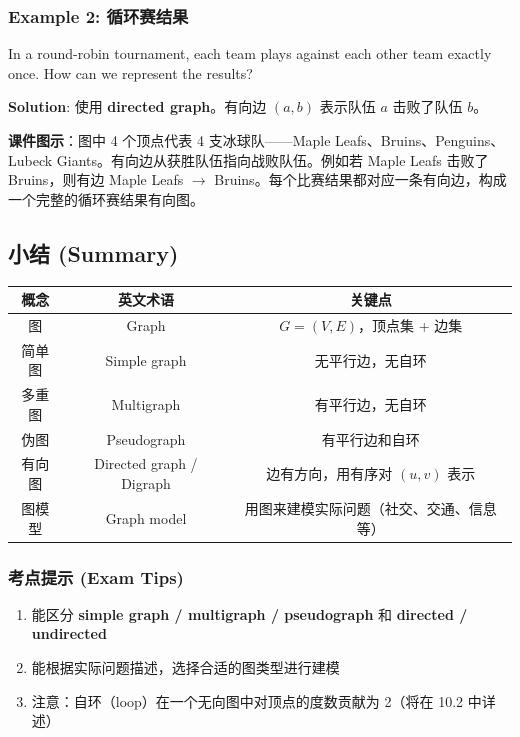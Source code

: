 \documentclass[10pt,a4paper,openany]{ctexbook}
\theoremstyle{definition}
\theoremstyle{remark}
\renewenvironment{quote}
  {\list{}{\leftmargin=1em\rightmargin=0pt\topsep=0.5pt\partopsep=0pt}\item[]}
  {\endlist}
\begin{document}
\subsubsection{Example 2: 循环赛结果}

\begin{quote}
In a round-robin tournament, each team plays against each other team exactly once. How can we represent the results?

\textbf{Solution}: 使用 \textbf{directed graph}。有向边 $(a, b)$ 表示队伍 $a$ 击败了队伍 $b$。

\textbf{课件图示}：图中 4 个顶点代表 4 支冰球队——Maple Leafs、Bruins、Penguins、Lubeck Giants。有向边从获胜队伍指向战败队伍。例如若 Maple Leafs 击败了 Bruins，则有边 Maple Leafs $\to$ Bruins。每个比赛结果都对应一条有向边，构成一个完整的循环赛结果有向图。

\end{quote}
\vspace{-2pt}

\subsection{小结 (Summary)}

\begin{center}
\begin{tabular}{ccc}
\hline
概念 & 英文术语 & 关键点 \\ \hline
图 & Graph & $G = (V, E)$，顶点集 + 边集 \\
简单图 & Simple graph & 无平行边，无自环 \\
多重图 & Multigraph & 有平行边，无自环 \\
伪图 & Pseudograph & 有平行边和自环 \\
有向图 & Directed graph / Digraph & 边有方向，用有序对 $(u,v)$ 表示 \\
图模型 & Graph model & 用图来建模实际问题（社交、交通、信息等） \\
\hline
\end{tabular}

\end{center}

\subsubsection{考点提示 (Exam Tips)}

\begin{enumerate}
\item 能区分 \textbf{simple graph / multigraph / pseudograph} 和 \textbf{directed / undirected}
\item 能根据实际问题描述，选择合适的图类型进行建模
\item 注意：自环（loop）在一个无向图中对顶点的度数贡献为 2（将在 10.2 中详述）

\end{enumerate}
\end{document}
